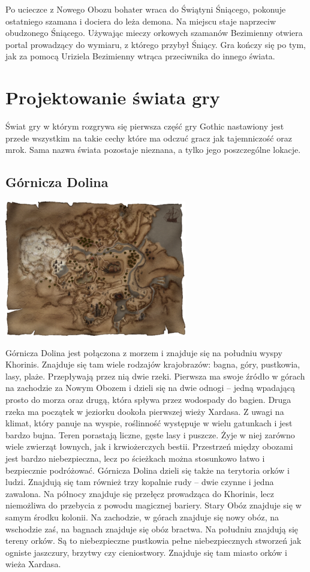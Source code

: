 \documentclass[11pt,polish, openany]{book}
\begin{document}
Po ucieczce z Nowego Obozu bohater wraca do Świątyni Śniącego, pokonuje ostatniego szamana i dociera do leża demona. Na miejscu staje naprzeciw obudzonego Śniącego. Używając mieczy orkowych szamanów Bezimienny otwiera portal prowadzący do wymiaru, z którego przybył Śniący. Gra kończy się po tym, jak za pomocą Uriziela Bezimienny wtrąca przeciwnika do innego świata.

\chapter{Projektowanie świata gry}\label{chapt:doe}
Świat gry w którym rozgrywa się pierwsza część gry Gothic nastawiony jest przede wszystkim na takie cechy które ma odczuć gracz jak tajemniczość oraz mrok. Sama nazwa świata pozostaje nieznana, a tylko jego poszczególne lokacje.
\section{Górnicza Dolina}
\begin{center}
 \includegraphics[scale=1.0]{dolina.jpg}
\end{center}
Górnicza Dolina jest połączona z morzem i znajduje się na południu wyspy Khorinis. Znajduje się tam wiele rodzajów krajobrazów: bagna, góry, pustkowia, lasy, plaże. Przepływają przez nią dwie rzeki. Pierwsza ma swoje źródło w górach na zachodzie za Nowym Obozem i dzieli się na dwie odnogi – jedną wpadającą prosto do morza oraz drugą, która spływa przez wodospady do bagien. Druga rzeka ma początek w jeziorku dookoła pierwszej wieży Xardasa. Z uwagi na klimat, który panuje na wyspie, roślinność występuje w wielu gatunkach i jest bardzo bujna. Teren porastają liczne, gęste lasy i puszcze. Żyje w niej zarówno wiele zwierząt łownych, jak i krwiożerczych bestii. Przestrzeń między obozami jest bardzo niebezpieczna, lecz po ścieżkach można stosunkowo łatwo i bezpiecznie podróżować. Górnicza Dolina dzieli się także na terytoria orków i ludzi. Znajdują się tam również trzy kopalnie rudy – dwie czynne i jedna zawalona. Na północy znajduje się przełęcz prowadząca do Khorinis, lecz niemożliwa do przebycia z powodu magicznej bariery. Stary Obóz znajduje się w samym środku kolonii. Na zachodzie, w górach znajduje się nowy obóz, na wschodzie zaś, na bagnach znajduje się obóz bractwa. Na południu znajdują się tereny orków. Są to niebezpieczne pustkowia pełne niebezpiecznych stworzeń jak ogniste jaszczury, brzytwy czy cieniostwory. Znajduje się tam miasto orków i wieża Xardasa.
\end{document}
